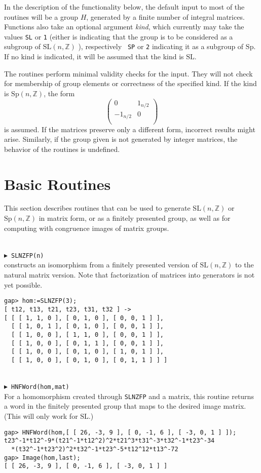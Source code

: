 \documentclass[a4paper,12pt]{amsart}
\newcommand{\Z}{\mathbb{Z}}
\newcommand{\SL}{\mathrm{SL}}
\newcommand{\Sp}{\mathrm{Sp}}
\def\mycmd#1{\ \smallskip\\$\blacktriangleright$\ #1\\}
\begin{document}
In the description of the functionality below, the default input to most of
the routines will be a group $H$, generated by a finite number of integral
matrices. Functions also take an optional argument {\em kind}, which
currently may take the values {\tt SL} or {\tt 1} (either is indicating that the
group is to be considered as a subgroup of $\SL(n,\Z)$ ), respectively {\tt
SP} or {\tt 2} indicating it as a subgroup of $\Sp$.
If no kind is indicated, it will be assumed that the kind is $\SL$.

The routines perform minimal validity checks for the input. They will not
check for membership of group elements or correctness of the specified kind.
If the kind is $\Sp(n,\Z)$, the form 
\[
\left(\begin{array}{cc}0&1_{n/2}\\
-1_{n/2}&0\\
\end{array}\right) 
\]
is assumed. If the matrices preserve only a different form, incorrect
results might arise. Similarly, if the group given is not generated by
integer matrices, the behavior of the routines is undefined.

\section{Basic Routines}

This section describes routines that can be used to generate $\SL(n,\Z)$ or
$\Sp(n,\Z)$ in matrix form, or as a finitely presented group, as well as for
computing with congruence images of matrix groups.

\mycmd{{\tt SLNZFP(n)}}
constructs an isomorphism from a finitely presented version of $\SL(n,\Z)$
to the natural matrix version. Note that factorization of matrices into
generators is not yet possible.
\begin{verbatim}
gap> hom:=SLNZFP(3);
[ t12, t13, t21, t23, t31, t32 ] ->
[ [ [ 1, 1, 0 ], [ 0, 1, 0 ], [ 0, 0, 1 ] ],
  [ [ 1, 0, 1 ], [ 0, 1, 0 ], [ 0, 0, 1 ] ],
  [ [ 1, 0, 0 ], [ 1, 1, 0 ], [ 0, 0, 1 ] ],
  [ [ 1, 0, 0 ], [ 0, 1, 1 ], [ 0, 0, 1 ] ],
  [ [ 1, 0, 0 ], [ 0, 1, 0 ], [ 1, 0, 1 ] ],
  [ [ 1, 0, 0 ], [ 0, 1, 0 ], [ 0, 1, 1 ] ] ]
\end{verbatim}

\mycmd{{\tt HNFWord(hom,mat)}}
For a homomorphism created through {\tt SLNZFP} and a matrix, this routine
returns a word in the finitely presented group that maps to the desired
image matrix. (This will only work for $\SL$.)
\begin{verbatim}
gap> HNFWord(hom,[ [ 26, -3, 9 ], [ 0, -1, 6 ], [ -3, 0, 1 ] ]);
t23^-1*t12^-9*(t21^-1*t12^2)^2*t21^3*t31^-3*t32^-1*t23^-34
  *(t32^-1*t23^2)^2*t32^-1*t23^-5*t12^12*t13^-72
gap> Image(hom,last);
[ [ 26, -3, 9 ], [ 0, -1, 6 ], [ -3, 0, 1 ] ]
\end{verbatim}
\end{document}

